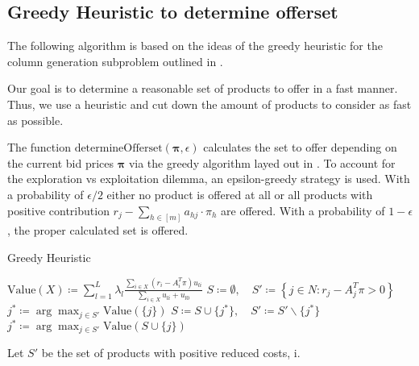 \subsection{Greedy Heuristic to determine offerset}\label{sec-determineOfferset}

The following algorithm is based on the ideas of the greedy heuristic for the column generation subproblem outlined in \cite{Bront.2009}.

Our goal is to determine a reasonable set of products to offer in a fast manner. Thus, we use a heuristic and cut down the amount of products to consider as fast as possible.

The function $\text{determineOfferset}(\mathbf{\pi}, \epsilon)$ calculates the set to offer depending on the current bid prices $\mathbf{\pi}$ via the greedy algorithm layed out in \cite{Bront.2009}. To account for the exploration vs exploitation dilemma, an epsilon-greedy strategy is used. With a probability of $\epsilon/2$ either no product is offered at all or all products with positive contribution $r_j - \sum_{h \in [m]} a_{hj} \cdot \pi_h$ are offered. With a probability of $1-\epsilon$, the proper calculated set is offered.


\begin{algorithm}
	\caption{Greedy Heuristic}\label{alg-GreedyHeuristic}
	\begin{algorithmic}[1] %
		\State $\text{Value}(X) \coloneqq \sum_{l=1}^{L} \lambda_l \frac{\sum_{i \in X}(r_i - A_i^T\pi)u_{li}}{\sum_{i \in X}u_{li} + u_{l0}}$
		\State $S\coloneqq \emptyset,\quad S' \coloneqq \left\{j \in N : r_j - A_j^T\pi > 0\right\}$ \label{alg-L1}
		\State $j^* \coloneqq \arg\max_{j \in S'} \text{Value}(\{j\})$
		\Repeat
		\State $S \coloneqq S \cup \{j^*\},\quad S' \coloneqq S'\backslash\{j^*\}$
		\State $j^* \coloneqq \arg \max_{j \in S'} \text{Value}(S \cup \{j\})$
	\end{algorithmic}
\end{algorithm}

Let $S'$ be the set of products with positive reduced costs, i. 

